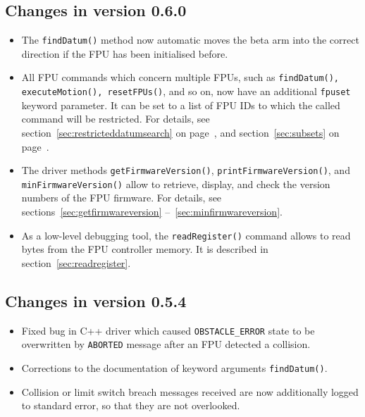 \documentclass[11pt,a4paper]{scrartcl}
\begin{document}
\subsection*{Changes in version 0.6.0}
\begin{itemize}
\item The \texttt{findDatum()} method now automatic moves the beta
  arm into the correct direction if the FPU has been initialised before.
  
\item All FPU commands which concern multiple FPUs, such as
  \texttt{findDatum(), executeMotion(), resetFPUs()}, and so on, now
  have an additional \texttt{fpuset} keyword parameter. It can be set
  to a list of FPU IDs to which the called command will be
  restricted. For details, see section~\ref{sec:restricteddatumsearch}
  on page~\pageref{sec:restricteddatumsearch}, and
  section~\ref{sec:subsets} on page~\pageref{sec:subsets}.
  
\item The driver methods \texttt{getFirmwareVersion()},
  \texttt{printFirmwareVersion()}, and \\
  \texttt{minFirmwareVersion()}
  allow to retrieve, display, and check the version numbers of the FPU
  firmware. For details, see sections~\ref{sec:getfirmwareversion}
    --~\ref{sec:minfirmwareversion}.

\item As a low-level debugging tool, the \texttt{readRegister()}
  command allows to read bytes from the FPU controller memory.  It is
  described in section~\ref{sec:readregister}.
  
\end{itemize}



\subsection*{Changes in version 0.5.4}
\begin{itemize}
\item Fixed bug in C++ driver which caused \texttt{OBSTACLE\_ERROR}
  state to be overwritten by \texttt{ABORTED} message after an FPU
  detected a collision.
\item Corrections to the documentation of keyword arguments \texttt{findDatum()}.
\item Collision or limit switch breach messages received are now
  additionally logged to standard error, so that they are not overlooked.
\end{itemize}
\end{document}
